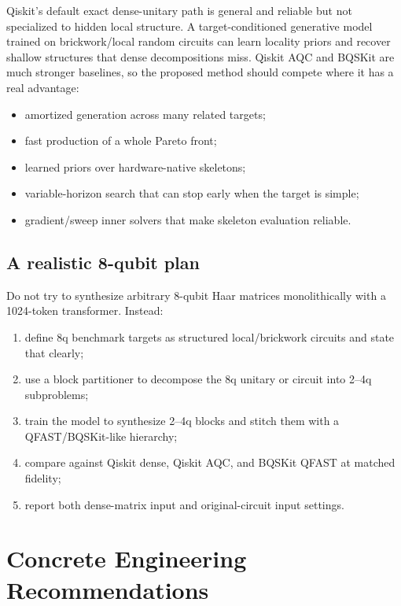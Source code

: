 \documentclass[11pt,a4paper]{article}
\begin{document}
Qiskit's default exact dense-unitary path is general and reliable but not
specialized to hidden local structure. A target-conditioned generative model
trained on brickwork/local random circuits can learn locality priors and
recover shallow structures that dense decompositions miss. Qiskit AQC and
BQSKit are much stronger baselines, so the proposed method should compete
where it has a real advantage:
\begin{itemize}[leftmargin=2em]
  \item amortized generation across many related targets;
  \item fast production of a whole Pareto front;
  \item learned priors over hardware-native skeletons;
  \item variable-horizon search that can stop early when the target is simple;
  \item gradient/sweep inner solvers that make skeleton evaluation reliable.
\end{itemize}

\subsection{A realistic 8-qubit plan}

Do not try to synthesize arbitrary 8-qubit Haar matrices monolithically with a
1024-token transformer. Instead:
\begin{enumerate}[leftmargin=2em]
  \item define 8q benchmark targets as structured local/brickwork circuits and
        state that clearly;
  \item use a block partitioner to decompose the 8q unitary or circuit into
        2--4q subproblems;
  \item train the model to synthesize 2--4q blocks and stitch them with a
        QFAST/BQSKit-like hierarchy;
  \item compare against Qiskit dense, Qiskit AQC, and BQSKit QFAST at matched
        fidelity;
  \item report both dense-matrix input and original-circuit input settings.
\end{enumerate}

\section{Concrete Engineering Recommendations}
\end{document}
